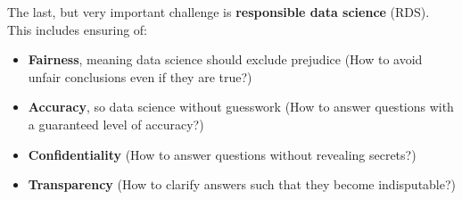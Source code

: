 The last, but very important challenge is \textbf{responsible data science} (RDS). This includes ensuring of:
\begin{itemize}
  \item \textbf{Fairness}, meaning data science should exclude prejudice {\color{gray}\footnotesize(How to avoid unfair conclusions even if they are true?)}
  \item \textbf{Accuracy}, so data science without guesswork {\color{gray}\footnotesize(How to answer questions with a guaranteed level of accuracy?)}
  \item \textbf{Confidentiality} {\color{gray}\footnotesize(How to answer questions without revealing secrets?)}
  \item \textbf{Transparency} {\color{gray}\footnotesize(How to clarify answers such that they become indisputable?)}
\end{itemize}